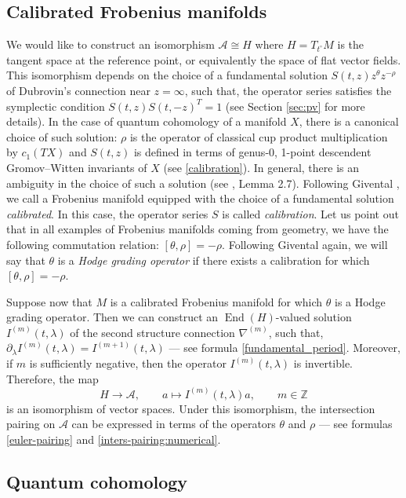 \documentclass[pdftex]{sigma}
\numberwithin{equation}{section}
\newcommand{\ZZ}{\mathbb{Z}}
\newcommand{\op}{\operatorname}
\newcommand{\A}{\mathcal{A}}
\begin{document}
\subsection{Calibrated Frobenius manifolds}\label{sec:cfm}
We would like to construct an isomorphism $\A\cong H$ where
$H=T_{t^\circ}M$ is the tangent space at the reference point, or
equivalently the space of flat vector fields. This isomorphism depends
on the choice of a fundamental solution $S(t,z) z^\theta z^{-\rho}$ of
Dubrovin's connection near $z=\infty$, such that, the operator series
satisfies the symplectic condition $S(t,z) S(t,-z)^T=1$ (see Section
\ref{sec:pv} for more details). In the case of quantum
cohomology of a manifold $X$, there is a canonical choice of such
solution: $\rho$ is the operator of classical cup product
multiplication by $c_1(TX)$ and $S(t,z)$ is defined in terms of
genus-0, 1-point descendent Gromov--Witten invariants of $X$ (see
\eqref{calibration}). In general, there is an ambiguity in the choice of such
a solution (see \cite{Dubrovin1999}, Lemma 2.7). Following Givental
\cite{Givental:qqh}, we call a Frobenius manifold equipped with the
choice of a fundamental solution {\em calibrated}. In this case, the
operator series $S$ is called {\em calibration}. Let us point out that
in all examples of Frobenius
manifolds coming from geometry, we have the following commutation
relation: $[\theta,\rho]=-\rho$. Following Givental again, we will say
that $\theta$ is a {\em Hodge grading operator} if there exists a
calibration for which $[\theta,\rho]=-\rho.$

Suppose now that $M$ is a calibrated Frobenius manifold for which
$\theta$ is a Hodge grading operator. Then we can construct an
$\op{End}(H)$-valued solution $I^{(m)}(t,\lambda)$ of the second structure
connection $\nabla^{(m)}$, such that, $\partial_\lambda
I^{(m)}(t,\lambda)=I^{(m+1)}(t,\lambda) $ --- see formula
\eqref{fundamental_period}. Moreover, if $m$ is sufficiently negative,
then the operator $I^{(m)}(t,\lambda)$ is invertible. Therefore, the
map
\begin{equation}\label{H-periods}
H\to \A,\qquad a\mapsto I^{(m)}(t,\lambda) a, \qquad m\in \ZZ
\end{equation}
is an isomorphism of vector spaces. Under this isomorphism, the
intersection pairing on $\A$ can be expressed in terms of the
operators $\theta$ and $\rho$ --- see formulas \eqref{euler-pairing} and
\eqref{inters-pairing:numerical}.



\subsection{Quantum cohomology}
\end{document}
